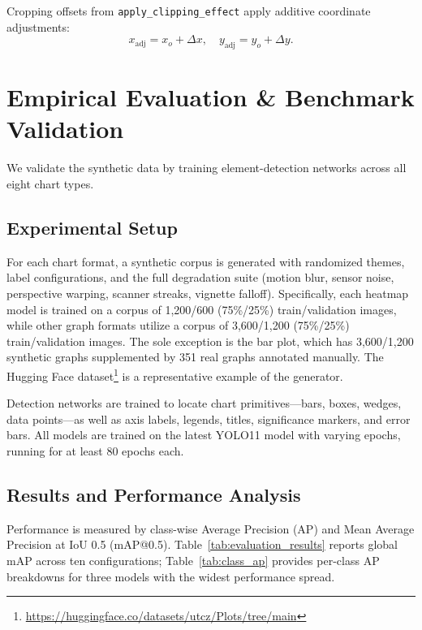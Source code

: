 \documentclass[11pt,twocolumn]{article}
\begin{document}
Cropping offsets from \texttt{apply\_clipping\_effect} apply additive coordinate adjustments:
\begin{equation}\label{eq:clip_adjust}
  x_{\text{adj}} = x_o + \Delta x,\quad y_{\text{adj}} = y_o + \Delta y.
\end{equation}

\section{Empirical Evaluation \& Benchmark Validation}\label{sec:evaluation}

We validate the synthetic data by training element-detection networks across all eight chart types.

\subsection{Experimental Setup}\label{sec:setup}

For each chart format, a synthetic corpus is generated with randomized themes, label configurations, and the full degradation suite (motion blur, sensor noise, perspective warping, scanner streaks, vignette falloff). Specifically, each heatmap model is trained on a corpus of 1,200/600 (75\%/25\%) train/validation images, while other graph formats utilize a corpus of 3,600/1,200 (75\%/25\%) train/validation images. The sole exception is the bar plot, which has 3,600/1,200 synthetic graphs supplemented by 351 real graphs annotated manually. The Hugging Face dataset\footnote{\url{https://huggingface.co/datasets/utcz/Plots/tree/main}} is a representative example of the generator.

Detection networks are trained to locate chart primitives---bars, boxes, wedges, data points---as well as axis labels, legends, titles, significance markers, and error bars. All models are trained on the latest YOLO11 model with varying epochs, running for at least 80 epochs each.

\subsection{Results and Performance Analysis}\label{sec:results}

Performance is measured by class-wise Average Precision (AP) and Mean Average Precision at IoU 0.5 (mAP@0.5). Table~\ref{tab:evaluation_results} reports global mAP across ten configurations; Table~\ref{tab:class_ap} provides per-class AP breakdowns for three models with the widest performance spread.
\end{document}
